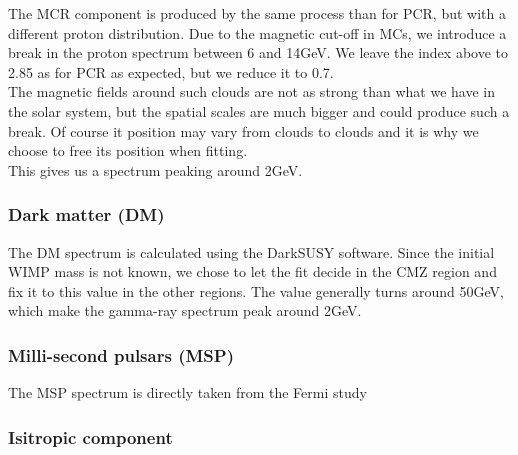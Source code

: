 The MCR component is produced by the same process than for PCR, but with a different proton distribution. Due to the magnetic cut-off in MCs, we introduce a break in the proton spectrum between 6 and 14GeV. We leave the index above to 2.85 as for PCR as expected, but we reduce it to 0.7.\\

The magnetic fields around such clouds are not as strong than what we have in the solar system, but the spatial scales are much bigger and could produce such a break. Of course it position may vary from clouds to clouds and it is why we choose to free its position when fitting.\\

This gives us a spectrum peaking around 2GeV.


\subsubsection{Dark matter (DM)}


The DM spectrum is calculated using the DarkSUSY software. Since the initial WIMP mass is not known, we chose to let the fit decide in the CMZ region and fix it to this value in the other regions. The value generally turns around 50GeV, which make the gamma-ray spectrum peak around 2GeV.


\subsubsection{Milli-second pulsars (MSP)}

The MSP spectrum is directly taken from the Fermi study 

\subsubsection{Isitropic component}

